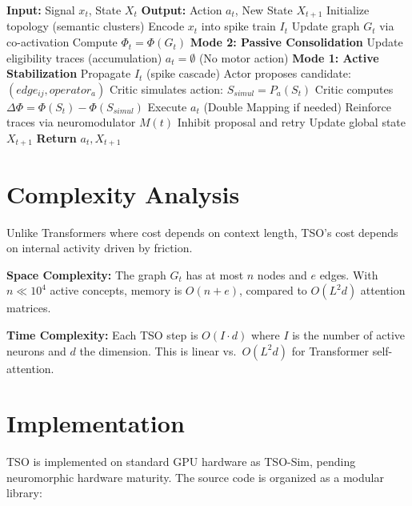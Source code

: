 \documentclass{article}
\begin{document}
\begin{algorithm}[h]
\caption{TSO Training Step}
\begin{algorithmic}[1]
\State \textbf{Input:} Signal $x_t$, State $X_t$
\State \textbf{Output:} Action $a_t$, New State $X_{t+1}$
\State Initialize topology (semantic clusters)
\State Encode $x_t$ into spike train $I_t$
\State Update graph $G_t$ via co-activation
\State Compute $\Phi_t = \Phi(G_t)$
 
    \State \textbf{Mode 2: Passive Consolidation}
    \State Update eligibility traces (accumulation)
    \State $a_t = \emptyset$ (No motor action)
\Else {}
    \State \textbf{Mode 1: Active Stabilization}
    \State Propagate $I_t$ (spike cascade)
    \State Actor proposes candidate: $(edge_{ij}, operator_a)$
    \State Critic simulates action: $S_{simul} = P_a(S_t)$
    \State Critic computes $\Delta\Phi = \Phi(S_t) - \Phi(S_{simul})$
        \State Execute $a_t$ (Double Mapping if needed)
        \State Reinforce traces via neuromodulator $M(t)$
    \Else
        \State Inhibit proposal and retry
    \EndIf
\EndIf
\State Update global state $X_{t+1}$
\State \textbf{Return} $a_t, X_{t+1}$
\end{algorithmic}
\end{algorithm}

\section{Complexity Analysis}

Unlike Transformers where cost depends on context length, TSO's cost depends on internal activity driven by friction.

\textbf{Space Complexity:} The graph $G_t$ has at most $n$ nodes and $e$ edges. With $n \ll 10^4$ active concepts, memory is $O(n + e)$, compared to $O(L^2 d)$ attention matrices.

\textbf{Time Complexity:} Each TSO step is $O(I \cdot d)$ where $I$ is the number of active neurons and $d$ the dimension. This is linear vs.\ $O(L^2 d)$ for Transformer self-attention.

\section{Implementation}

TSO is implemented on standard GPU hardware as TSO-Sim, pending neuromorphic hardware maturity. The source code is organized as a modular library:
\end{document}
